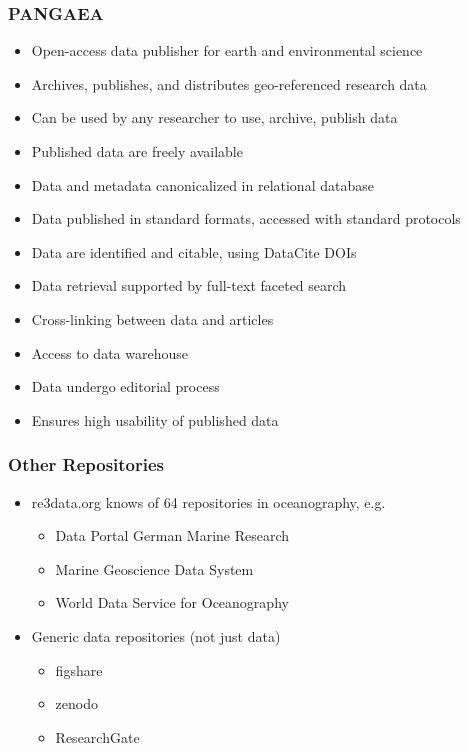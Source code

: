 \documentclass{beamer}
\begin{document}
\begin{frame}
  \frametitle{PANGAEA}
  
  \begin{itemize}
  \item Open-access data publisher for earth and environmental science
  \item Archives, publishes, and distributes geo-referenced research data
  \item Can be used by any researcher to use, archive, publish data
  \item Published data are freely available
  \item Data and metadata canonicalized in relational database
  \item Data published in standard formats, accessed with standard protocols
  \item Data are identified and citable, using DataCite DOIs
  \item Data retrieval supported by full-text faceted search
  \item Cross-linking between data and articles
  \item Access to data warehouse
  \item Data undergo editorial process
  \item Ensures high usability of published data
  \end{itemize}
\end{frame}

\begin{frame}
  \frametitle{Other Repositories}
  
  \begin{itemize}
  \item re3data.org knows of 64 repositories in oceanography, e.g.
  \begin{itemize}
  \item Data Portal German Marine Research
  \item Marine Geoscience Data System
  \item World Data Service for Oceanography
  \end{itemize}
  \item Generic data repositories (not just data)
  \begin{itemize}
  \item figshare
  \item zenodo
  \item ResearchGate
  \end{itemize}
  \end{itemize}
\end{frame}
\end{document}
